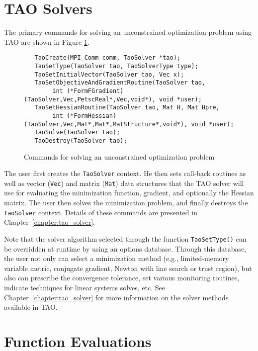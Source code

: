 \section{TAO Solvers}

The primary commands for solving an unconstrained optimization problem
using TAO are shown in Figure \ref{fig:tao_commands}.
 
 
 

\begin{figure}[H]
\begin{verbatim}
   TaoCreate(MPI_Comm comm, TaoSolver *tao); 
   TaoSetType(TaoSolver tao, TaoSolverType type);
   TaoSetInitialVector(TaoSolver tao, Vec x);
   TaoSetObjectiveAndGradientRoutine(TaoSolver tao, 
        int (*FormFGradient)(TaoSolver,Vec,PetscReal*,Vec,void*), void *user);
   TaoSetHessianRoutine(TaoSolver tao, Mat H, Mat Hpre,
        int (*FormHessian)(TaoSolver,Vec,Mat*,Mat*,MatStructure*,void*), void *user);
   TaoSolve(TaoSolver tao);
   TaoDestroy(TaoSolver tao);
\end{verbatim}
\caption{Commands for solving an unconstrained optimization problem
\label{fig:tao_commands}}
\end{figure}

\noindent
The user first creates the \texttt{TaoSolver} context. 
He then sets call-back routines as
well as vector (\texttt{Vec}) and matrix (\texttt{Mat}) data
structures that the TAO solver will use for evaluating the
minimization function, gradient, and optionally the Hessian matrix.
The user then solves the minimization problem, and finally destroys
the \texttt{TaoSolver} context.
Details of these commands are presented in
Chapter~\ref{chapter:tao_solver}.

Note that the solver algorithm selected through the function 
\texttt{TaoSetType()} can be overridden
at runtime by using an options database.  Through this
database, the user not only can select a minimization method (e.g.,
limited-memory variable metric, conjugate gradient, Newton with line
search or trust region), but also can prescribe the convergence
tolerance, set various monitoring routines, indicate techniques for
linear systems solves, etc.  See Chapter~\ref{chapter:tao_solver} for more 
information on the solver methods available in TAO.

\section{Function Evaluations}

